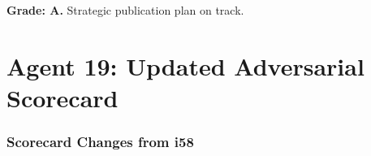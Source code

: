 \documentclass[11pt,a4paper]{article}
\begin{document}
\begin{tcolorbox}[colback=green!5!white, colframe=green!60!black, title={Agent 18: Paper Pipeline --- 8 PAPERS PLANNED, 104 TOPICS GENERATED}]
\textbf{Grade: A.} Strategic publication plan on track.
\end{tcolorbox}


\part{Agent 19: Updated Adversarial Scorecard}
\label{part:scorecard}

\section{Scorecard Changes from i58}
\end{document}
